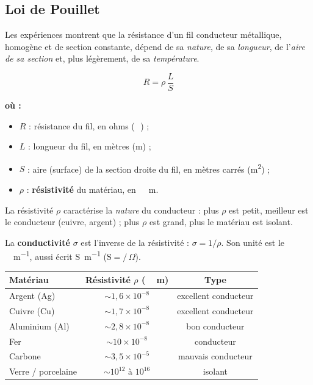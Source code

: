 \documentclass[11pt,a4paper]{article}
\newenvironment{ou}{%
  \par\smallskip\noindent\textbf{où :}\nopagebreak
  \begin{itemize}[leftmargin=1.8em,topsep=2pt,itemsep=1.5pt,parsep=0pt]}%
  {\end{itemize}}
\newcommand{\ohm}{\,\Omega}
\begin{document}
\subsection{Loi de Pouillet}

Les expériences montrent que la résistance d'un fil conducteur métallique, homogène et de section
constante, dépend de sa \emph{nature}, de sa \emph{longueur}, de l'\emph{aire de sa section} et,
plus légèrement, de sa \emph{température}.

\begin{formule}
\[ \boxed{\,R = \rho\,\dfrac{L}{S}\,} \]
\begin{ou}
  \item $R$ : résistance du fil, en ohms (\si{\ohm}) ;
  \item $L$ : longueur du fil, en mètres (\si{\metre}) ;
  \item $S$ : aire (surface) de la section droite du fil, en mètres carrés (\si{\metre\squared}) ;
  \item $\rho$ : \textbf{résistivité} du matériau, en \si{\ohm\metre}.
\end{ou}
La résistivité $\rho$ caractérise la \emph{nature} du conducteur : plus $\rho$ est petit, meilleur est
le conducteur (cuivre, argent) ; plus $\rho$ est grand, plus le matériau est isolant.
\end{formule}

\begin{definition}[conductivité]
La \textbf{conductivité} $\sigma$ est l'inverse de la résistivité : $\sigma = 1/\rho$. Son unité est
le \si{\per\ohm\per\metre}, aussi écrit \si{\siemens\per\metre} ($\mathrm{S}=\si{\per\ohm}$).
\end{definition}

\begin{center}
\begin{tabular}{lcc}
\rowcolor{primary!18}
\textbf{Matériau} & \textbf{Résistivité $\rho$ (\si{\ohm\metre})} & \textbf{Type} \\
\midrule
Argent (Ag)   & $\sim 1{,}6\times10^{-8}$ & excellent conducteur \\
Cuivre (Cu)   & $\sim 1{,}7\times10^{-8}$ & excellent conducteur \\
Aluminium (Al)& $\sim 2{,}8\times10^{-8}$ & bon conducteur \\
Fer           & $\sim 10\times10^{-8}$    & conducteur \\
Carbone       & $\sim 3{,}5\times10^{-5}$ & mauvais conducteur \\
Verre / porcelaine & $\sim 10^{12}$ à $10^{16}$ & isolant \\
\bottomrule
\end{tabular}
\end{center}
\end{document}
